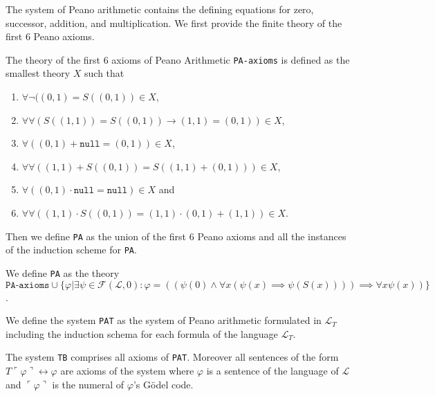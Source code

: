 The system of Peano arithmetic contains the defining equations for zero, successor, addition, and multiplication. We first provide the finite theory of the first 6 Peano axioms.
\begin{definition}\label{def:PA-Axioms}
  \leanok
    The theory of the first 6 axioms of Peano Arithmetic \texttt{PA-axioms} is defined as the smallest theory $X$ such that
    \begin{enumerate}
        \item $\forall \neg ((0,1) = S((0,1)) \in X$, 
        \item $\forall \forall (S((1,1)) = S((0,1)) \rightarrow (1,1) = (0,1)) \in X$,
        \item $\forall ((0,1) + \texttt{null} = (0,1)) \in X$,
        \item $\forall \forall ((1,1) + S((0,1)) = S((1,1)+(0,1))) \in X$,
        \item $\forall ((0,1) \cdot \texttt{null} = \texttt{null}) \in X$ and
        \item $\forall  \forall ((1,1) \cdot S((0,1)) = (1,1) \cdot (0,1) + (1,1)) \in X$.
    \end{enumerate}
\end{definition}

Then we define \texttt{PA} as the union of the first 6 Peano axioms and all the instances of the induction scheme for \texttt{PA}.
\begin{definition}\label{def:PA}
  \leanok
  We define \texttt{PA} as the theory $\texttt{PA-axioms} \cup \{φ | ∃ψ \in \mathcal{F}(\mathcal{L},{0}) : φ = ((ψ(0) \wedge ∀x(ψ(x) ⟹ ψ(S(x)))) ⟹ ∀xψ(x))\}$.
\end{definition}

\begin{definition}
    We define the system \texttt{PAT} as the system of Peano arithmetic formulated in $\mathcal{L}_T$ including the induction schema for each formula of the language $\mathcal{L}_T$.
\end{definition}

\begin{definition}[\texttt{TB}]
    The system \texttt{TB} comprises all axioms of \texttt{PAT}. Moreover all sentences of the form $T\ulcorner\varphi\urcorner \leftrightarrow \varphi$ are axioms of the system where $\varphi$ is a sentence of the language of $\mathcal{L}$ and $\ulcorner \varphi \urcorner$ is the numeral of $\varphi$'s Gödel code.
\end{definition}

